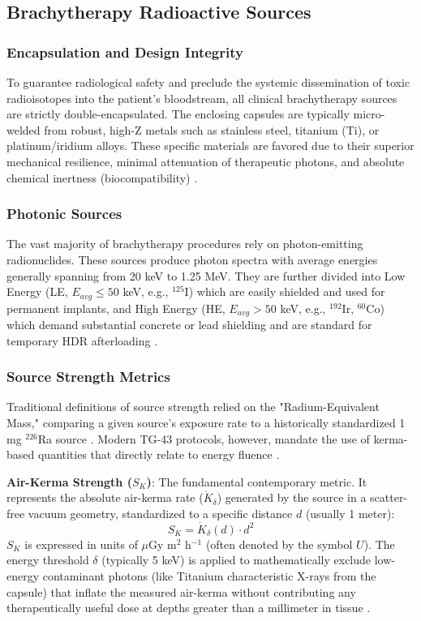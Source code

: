 \subsection{Brachytherapy Radioactive Sources}
\subsubsection{Encapsulation and Design Integrity}
To guarantee radiological safety and preclude the systemic dissemination of toxic radioisotopes into the patient's bloodstream, all clinical brachytherapy sources are strictly double-encapsulated. The enclosing capsules are typically micro-welded from robust, high-Z metals such as stainless steel, titanium (Ti), or platinum/iridium alloys. These specific materials are favored due to their superior mechanical resilience, minimal attenuation of therapeutic photons, and absolute chemical inertness (biocompatibility) \cite{podgorsak2005radiation}.

\subsubsection{Photonic Sources}
The vast majority of brachytherapy procedures rely on photon-emitting radionuclides. These sources produce photon spectra with average energies generally spanning from 20 keV to 1.25 MeV. They are further divided into Low Energy (LE, $E_{avg} \le 50$ keV, e.g., $^{125}$I) which are easily shielded and used for permanent implants, and High Energy (HE, $E_{avg} > 50$ keV, e.g., $^{192}$Ir, $^{60}$Co) which demand substantial concrete or lead shielding and are standard for temporary HDR afterloading \cite{khan2014physics}.

\subsubsection{Source Strength Metrics}
Traditional definitions of source strength relied on the "Radium-Equivalent Mass," comparing a given source's exposure rate to a historically standardized 1 mg $^{226}$Ra source \cite{jayaraman1992clinical}. Modern TG-43 protocols, however, mandate the use of kerma-based quantities that directly relate to energy fluence \cite{nath1995dosimetry}.

\textbf{Air-Kerma Strength ($S_K$)}: The fundamental contemporary metric. It represents the absolute air-kerma rate ($\dot{K}_{\delta}$) generated by the source in a scatter-free vacuum geometry, standardized to a specific distance $d$ (usually 1 meter):
\begin{equation}
S_K = \dot{K}_{\delta}(d) \cdot d^2
\end{equation}
$S_K$ is expressed in units of $\mu$Gy m$^2$ h$^{-1}$ (often denoted by the symbol $U$). The energy threshold $\delta$ (typically 5 keV) is applied to mathematically exclude low-energy contaminant photons (like Titanium characteristic X-rays from the capsule) that inflate the measured air-kerma without contributing any therapeutically useful dose at depths greater than a millimeter in tissue \cite{rivard2004update}.

